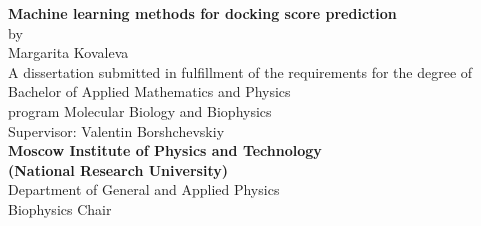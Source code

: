 \begin{center}
\thispagestyle{empty}
\hfill \break
\LARGE{\textbf{Machine learning methods for docking score prediction}}\\
\Large{by\\
Margarita Kovaleva}\\
\hfill \break
\hfill \break
\hfill \break
\large{A dissertation submitted in fulfillment of the requirements for the degree of Bachelor of Applied Mathematics and Physics\\
\hfill \break
program Molecular Biology and Biophysics}\\
\hfill \break
\hfill \break
\hfill \break
\Large{Supervisor: Valentin Borshchevskiy}\\
\hfill \break
\hfill \break
\hfill \break
\hfill \break
\large{\textbf{Moscow Institute of Physics and Technology\\ (National Research University)}}\\
\hfill \break
\large{Department of General and Applied Physics\\
Biophysics Chair}\\
\hfill \break
\hfill {} \end{center}
 
\newpage